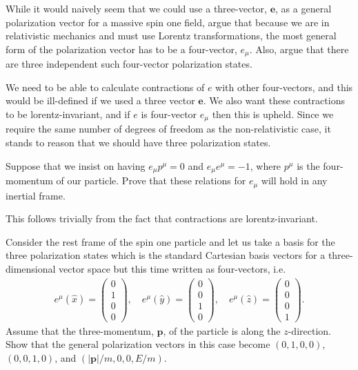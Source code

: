 \documentclass[working, oneside]{../../../Preambles/tuftebook}
\begin{document}
\begin{exercise}[1]
While it would naively seem that we could use a three-vector, $\bm e$, 
as a general polarization vector for a massive spin one field, argue that 
because we are in relativistic mechanics and must use Lorentz transformations, the
most general form of the polarization vector has to be a four-vector, $e_\mu$.
Also, argue that there are three independent such four-vector polarization states.
\end{exercise}
\begin{solution}
We need to be able to calculate contractions of $e$ with other four-vectors, and this would be ill-defined if we used a three vector $\mathbf{e}$. We also want these contractions to be lorentz-invariant, and if $e$ is four-vector $e_{\mu}$ then this is upheld. Since we require the same number of degrees of freedom as the non-relativistic case, it stands to reason that we should have three polarization states.
\end{solution}
\begin{exercise}[2]
Suppose that we insist on having $e_\mu p^\mu=0$ and $e_\mu e^\mu=-1$, 
where $p^\mu$ is the four-momentum of our particle. Prove that these relations for 
$e_\mu$ will hold in any inertial frame. 
\end{exercise}
\begin{solution}
This follows trivially from the fact that contractions are lorentz-invariant.
\end{solution}
\begin{exercise}[3]
Consider the rest frame of the spin one particle and let us take a 
basis for the three polarization states which is the standard Cartesian basis vectors
for a three-dimensional vector space but this time written as four-vectors, i.e. 
\begin{align}
e^\mu(\hat{x})=\left(\begin{matrix}0\\1\\0\\0\end{matrix}\right),\quad
e^\mu(\hat{y})=\left(\begin{matrix}0\\0\\1\\0\end{matrix}\right),\quad
e^\mu(\hat{z})=\left(\begin{matrix}0\\0\\0\\1\end{matrix}\right).
\end{align}
Assume that the three-momentum, $\bm p$, of the particle is along the 
$z$-direction. Show that the general polarization vectors in this case
become $(0,1,0,0)$, $(0,0,1,0)$, and $(|\bm p|/m,0,0,E/m)$.
\end{exercise}
\end{document}
